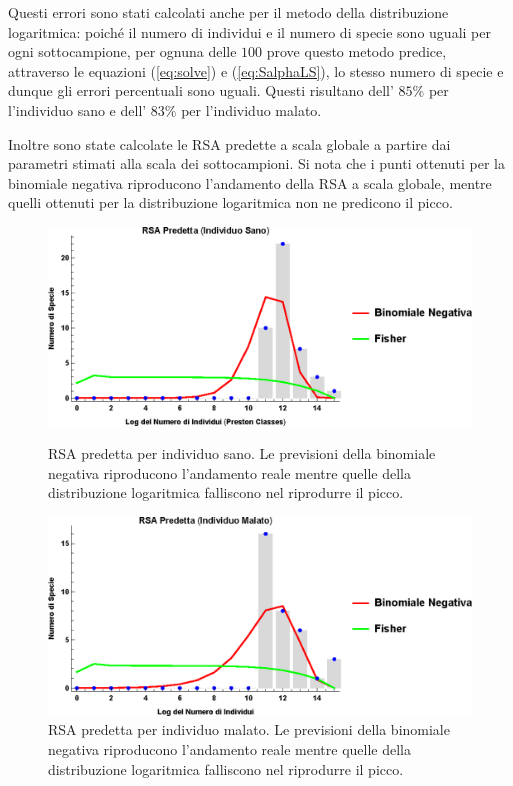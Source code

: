 Questi errori sono stati calcolati anche per il metodo della distribuzione logaritmica: poiché il numero di individui e il numero di specie sono uguali per ogni sottocampione, per ognuna delle $100$ prove questo metodo predice, attraverso le equazioni (\ref{eq:solve}) e (\ref{eq:SalphaLS}), lo stesso numero di specie e dunque gli errori percentuali sono uguali. Questi risultano dell' $ 85 \%$ per l'individuo sano e dell' $ 83 \% $ per l'individuo malato.

Inoltre sono state calcolate le RSA predette a scala globale a partire dai parametri stimati alla scala dei sottocampioni. Si nota che i punti ottenuti per la binomiale negativa riproducono l'andamento della RSA a scala globale, mentre quelli ottenuti per la distribuzione logaritmica non ne predicono il picco.

\begin{figure}[H]
  \centering
  \begin{minipage}[b]{0.4\textwidth}
    \includegraphics[width=\textwidth]{Figure/rsapredH.eps}
    \caption{RSA predetta per individuo sano. Le previsioni della binomiale negativa riproducono l'andamento reale mentre quelle della distribuzione logaritmica falliscono nel riprodurre il picco.}
    \label{fig:rsapredH}
  \end{minipage}
  \hfill
  \begin{minipage}[b]{0.4\textwidth}
    \includegraphics[width=\textwidth]{Figure/rsapredC.eps}
    \caption{RSA predetta per individuo malato. Le previsioni della binomiale negativa riproducono l'andamento reale mentre quelle della distribuzione logaritmica falliscono nel riprodurre il picco.}
    \label{fig:rsapredC}
  \end{minipage}
\end{figure}

